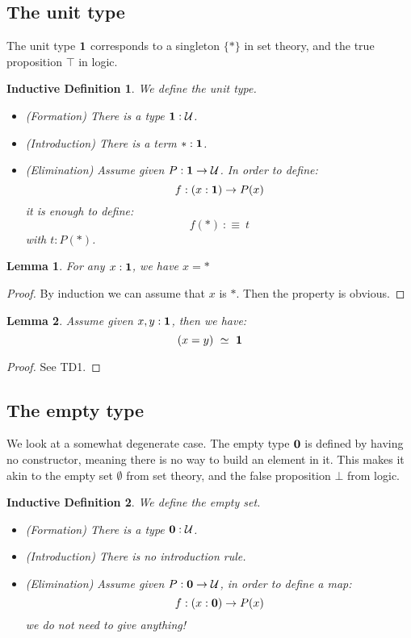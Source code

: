 \documentclass{article}
\newcommand{\sse}[1]{\medbreak \subsection{#1}}
\newcommand{\U}{{\mathcal U}}
\renewcommand{\r}{\rightarrow}
\newcommand{\one}{{\bf 1}}
\newcommand{\zero}{{\bf 0}}
\newtheorem{lemma}{Lemma}
\newtheorem{ind_def}{Inductive Definition}
\begin{document}
\sse{The unit type}

The unit type $\one$ corresponds to a singleton $\{*\}$ in set theory, and the true proposition $\top$ in logic.

\begin{ind_def}
We define the unit type.
\begin{itemize}
\item (Formation) There is a type $\one:\U$.
\item (Introduction) There is a term $*:\one$.
\item (Elimination) Assume given $P : \one \r \U$. In order to define:
\[f:(x:\one) \r P(x)\]
it is enough to define:
\[f(*) \ :\equiv\ t\]
with $t:P(*)$.
\end{itemize}
\end{ind_def}


\begin{lemma}
For any $x:\one$, we have $x=*$
\end{lemma}
\begin{proof}
By induction we can assume that $x$ is $*$. Then the property is obvious.
\end{proof}

\begin{lemma}
Assume given $x,y:\one$, then we have:
\[(x=y)\ \simeq \ \one\]
\end{lemma}
\begin{proof}
See TD1.
\end{proof}


\sse{The empty type}

We look at a somewhat degenerate case. The empty type $\zero$ is defined by having no constructor, meaning there is no way to build an element in it. This makes it akin to the empty set $\emptyset$ from set theory, and the false proposition $\bot$ from logic. %

\begin{ind_def}
We define the empty set.
\begin{itemize}
\item (Formation) There is a type $\zero : \U$.
\item (Introduction) There is no introduction rule.
\item (Elimination) Assume given $P : \zero\r \U$, in order to define a map:
\[f: (x:\zero) \r P(x)\]
we do not need to give anything!
\end{itemize}
\end{ind_def}
\end{document}
